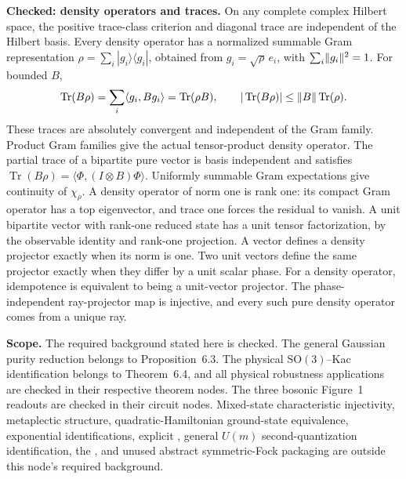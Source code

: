 \begin{lemma}
  \textbf{Checked: density operators and traces.}
  On any complete complex Hilbert space, the positive trace-class criterion
  and diagonal trace are independent of the Hilbert basis. Every density
  operator has a normalized summable Gram representation
  $\rho=\sum_i|g_i\rangle\langle g_i|$, obtained from $g_i=\sqrt\rho\,e_i$,
  with $\sum_i\lVert g_i \rVert^2=1$. For bounded $B$,
  \[
    \operatorname{Tr}(B\rho)=\sum_i\langle g_i,Bg_i\rangle
      =\operatorname{Tr}(\rho B),\qquad
    |\operatorname{Tr}(B\rho)|\le\lVert B \rVert\operatorname{Tr}(\rho).
  \]
  These traces are absolutely convergent and independent of the Gram family.
  Product Gram families give the actual tensor-product density operator.
  The partial trace of a bipartite pure vector is basis independent and
  satisfies $\operatorname{Tr}(B\rho)=\langle\Phi,(I\otimes B)\Phi\rangle$.
  Uniformly summable Gram expectations give continuity of $\chi_\rho$.
  A density operator of norm one is rank one: its compact Gram operator has
  a top eigenvector, and trace one forces the residual to vanish. A unit
  bipartite vector with rank-one reduced state has a unit tensor factorization,
  by the observable identity and rank-one projection.
  A vector defines a density projector exactly when its norm is one.
  Two unit vectors define the same projector exactly when they differ by a
  unit scalar phase. For a density operator, idempotence is equivalent to
  being a unit-vector projector. The phase-independent ray-projector map is
  injective, and every such pure density operator comes from a unique ray.

  \textbf{Scope.} The required background stated here is checked.
  The general Gaussian purity reduction belongs to Proposition~6.3. The
  physical $\mathrm{SO}(3)$--Kac identification belongs to Theorem~6.4,
  and all physical robustness applications are checked in their respective
  theorem nodes. The three bosonic Figure~1 readouts are checked in their circuit nodes.
  Mixed-state characteristic injectivity, metaplectic structure,
  quadratic-Hamiltonian ground-state equivalence, exponential identifications,
  explicit ,
  general $U(m)$ second-quantization identification, the
  , and unused
  abstract symmetric-Fock packaging are outside this node's required background.
\end{lemma}

